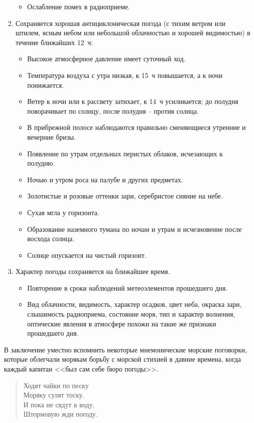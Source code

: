 \documentclass[a4paper, 12pt, twoside, final, book, russian, fittopage, cyremdash]{ncc}
\begin{document}
\begin{enumerate}
\begin{itemize}
  \item Ослабление помех в радиоприеме.
  \end{itemize}
\item Сохраняется хорошая антициклоническая погода (с тихим ветром или штилем, ясным небом или небольшой облачностью и хорошей видимостью) в течение ближайших 12~ч:
  \begin{itemize}
  \item Высокое атмосферное давление имеет суточный ход.
  \item Температура воздуха с утра низкая, к 15~ч повышается, а к ночи понижается.
  \item Ветер к ночи или к рассвету затихает, к 14~ч усиливается; до полудня поворачивает по солнцу, после полудня \--- против солнца.
  \item В прибрежной полосе наблюдаются правильно сменяющиеся утренние и вечерние бризы.
  \item Появление по утрам отдельных перистых облаков, исчезающих к полудню.
  \item Ночью и утром роса на палубе и других предметах.
  \item Золотистые и розовые оттенки зари, серебристое сияние на небе.
  \item Сухая мгла у горизонта.
  \item Образование наземного тумана по ночам и утрам и исчезновение после восхода солнца.
  \item Солнце опускается на чистый горизонт.
  \end{itemize}
\item Характер погоды сохраняется на ближайшее время.
  \begin{itemize}
  \item Повторение в сроки наблюдений метеоэлементов прошедшего дня.
  \item Вид облачности, видимость, характер осадков, цвет неба, окраска зари, слышимость радиоприема, состояние моря, тип и характер волнения, оптические явления в атмосфере похожи на такие же признаки прошедшего дня.
  \end{itemize}
\end{enumerate}

В заключение уместно вспомнить некоторые мнемонические морские поговорки, которые облегчали морякам борьбу с морской стихией в давние времена, когда каждый капитан <<был сам себе бюро погоды>>.

\begin{quote}
Ходят чайки по песку \\
Моряку сулят тоску. \\
И пока не сядут в воду, \\
Штормовую жди погоду.
\end{quote}
\end{document}
